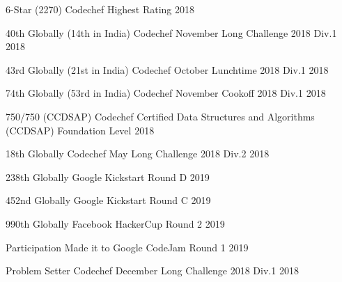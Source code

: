 \begin{cvhonors}

\cvhonor
{6-Star (2270)} %
{Codechef Highest Rating} %
{} %
{2018} %


\cvhonor
{40th Globally (14th in India)} %
{Codechef November Long Challenge 2018 Div.1} %
{} %
{2018} %


\cvhonor
{43rd Globally (21st in India)} %
{Codechef October Lunchtime 2018 Div.1} %
{} %
{2018} %


\cvhonor
{74th Globally (53rd in India)} %
{Codechef November Cookoff 2018 Div.1} %
{} %
{2018} %


\cvhonor
{750/750 (CCDSAP)} %
{Codechef Certified Data Structures and Algorithms (CCDSAP) Foundation Level} %
{} %
{2018} %


\cvhonor
{18th Globally} %
{Codechef May Long Challenge 2018 Div.2} %
{} %
{2018} %


\cvhonor
{238th Globally} %
{Google Kickstart Round D} %
{} %
{2019} %


\cvhonor
{452nd Globally} %
{Google Kickstart Round C} %
{} %
{2019} %


\cvhonor
{990th Globally} %
{Facebook HackerCup Round 2} %
{} %
{2019} %


\cvhonor
{Participation} %
{Made it to Google CodeJam Round 1} %
{} %
{2019} %


\cvhonor
{Problem Setter} %
{Codechef December Long Challenge 2018 Div.1} %
{} %
{2018} %


\end{cvhonors}
